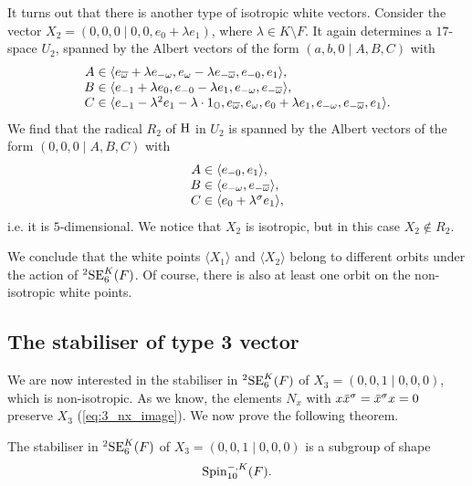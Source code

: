 It turns out that there is another type of isotropic white vectors. Consider the vector
$X_2 = (0,0,0 \mid 0,0,e_0 + \lambda e_1)$, where $\lambda \in K\setminus F$. It again determines a 
$17$-space $U_2$, spanned by the Albert vectors of the form $(a,b,0\mid A,B,C)$ with 
\begin{equation}
	\begin{array}{r@{\;}c@{\;}l}
		A & \in & \langle e_{\bar{\omega}}+\lambda e_{-\omega}, e_{\omega}-\lambda e_{-\bar{\omega}}
		, e_{-0}, e_1
		\rangle, \\
		B & \in & \langle e_{-1}+\lambda e_0, e_{-0} - \lambda e_1,
	e_{-\omega}, e_{-\bar{\omega}}  \rangle, \\
		C & \in & \langle e_{-1}-\lambda^2 e_1 - \lambda \cdot 1_{\O}, e_{\bar{\omega}}, e_{\omega},
	e_0 + \lambda e_1, e_{-\omega}, e_{-\bar{\omega}}, e_1 \rangle.
	\end{array}
\end{equation}
We find that the radical $R_2$ of $\mathrm{H}$ in $U_2$ is spanned by the Albert vectors of the form 
$(0,0,0\mid A,B,C)$ with 
\begin{equation}
	\begin{array}{r@{\;}c@{\;}l}
		A & \in & \langle e_{-0}, e_1 \rangle, \\
		B & \in & \langle e_{-\omega}, e_{-\bar{\omega}} \rangle, \\
		C & \in & \langle e_0 + \lambda^{\s} e_1 \rangle,
	\end{array}
\end{equation}
i.e. it is $5$-dimensional. We notice that $X_2$ is isotropic, but in this case $X_2 \not\in R_2$.

We conclude that the white points $\langle X_1 \rangle$ and $\langle X_2 \rangle$ belong to different
orbits under the action of ${}^2\mathrm{SE}_6^K(F)$. Of course, there is also at least one orbit on the 
non-isotropic white points. 

\subsection{The stabiliser of type 3 vector}

We are now interested in the stabiliser in ${}^2\mathrm{SE}_6^K(F)$ of 
$X_3 = (0,0,1\mid 0,0,0)$, which is non-isotropic. As we know, the elements
$N_x$ with $x\ovx^{\s} = \ovx^{\s}x = 0$ preserve $X_3$ (\ref{eq:3_nx_image}).
We now prove the following theorem.

\begin{theorem}
	\label{theorem:2_type3_stabiliser}
	The stabiliser in ${}^2\mathrm{SE}_6^K(F)$ of $X_3 = (0,0,1\mid 0,0,0)$ 
	is a subgroup of shape
	\begin{equation}
		\mathrm{Spin}_{10}^{-,K}(F).
	\end{equation}
\end{theorem}

